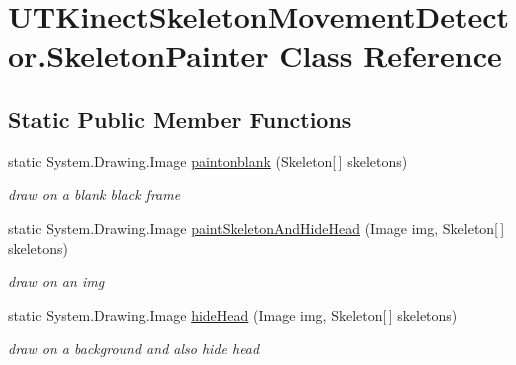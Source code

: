 \hypertarget{classUTKinectSkeletonMovementDetector_1_1SkeletonPainter}{\section{U\-T\-Kinect\-Skeleton\-Movement\-Detector.\-Skeleton\-Painter Class Reference}
\label{classUTKinectSkeletonMovementDetector_1_1SkeletonPainter}
}
\subsection*{Static Public Member Functions}
\begin{DoxyCompactItemize}
\item 
static System.\-Drawing.\-Image \hyperlink{classUTKinectSkeletonMovementDetector_1_1SkeletonPainter_a7fdb142bafc43845084ae2208ad98ed4}{paintonblank} (Skeleton\mbox{[}$\,$\mbox{]} skeletons)
\begin{DoxyCompactList}\small\item\em draw on a blank black frame \end{DoxyCompactList}\item 
static System.\-Drawing.\-Image \hyperlink{classUTKinectSkeletonMovementDetector_1_1SkeletonPainter_a75e75c7dc95899e548e0b294cd164c3b}{paint\-Skeleton\-And\-Hide\-Head} (Image img, Skeleton\mbox{[}$\,$\mbox{]} skeletons)
\begin{DoxyCompactList}\small\item\em draw on an img \end{DoxyCompactList}\item 
static System.\-Drawing.\-Image \hyperlink{classUTKinectSkeletonMovementDetector_1_1SkeletonPainter_ad4f37b20c059cd693d3e557aeee44377}{hide\-Head} (Image img, Skeleton\mbox{[}$\,$\mbox{]} skeletons)
\begin{DoxyCompactList}\small\item\em draw on a background and also hide head \end{DoxyCompactList}\end{DoxyCompactItemize}
